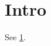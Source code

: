 \documentclass{article}
\begin{document}
\section{Intro}\label{sec:intro}
See \cref{sec:intro}.
\end{document}
